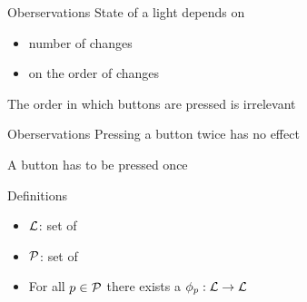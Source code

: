 \begin{frame}{Oberservations}
	State of a light depends on
	\begin{itemize}
		\item number of changes
		\item {} on the order of changes
	\end{itemize}
	
	\pause
	
	The order in which buttons are pressed is irrelevant
\end{frame}

\begin{frame}{Oberservations}
	Pressing a button twice has no effect
	
	\pause
	
	A button has to be pressed  once
\end{frame}

\begin{frame}{Definitions}
	\begin{definition}
		\begin{itemize}
			\item $\mathcal{L}$: set of 
			\item $\mathcal{P}$: set of 
			\item For all $p \in \mathcal{P}$ there exists a $\phi_{p}: \mathcal{L} \rightarrow \mathcal{L}$
		\end{itemize}
	\end{definition}
\end{frame}
